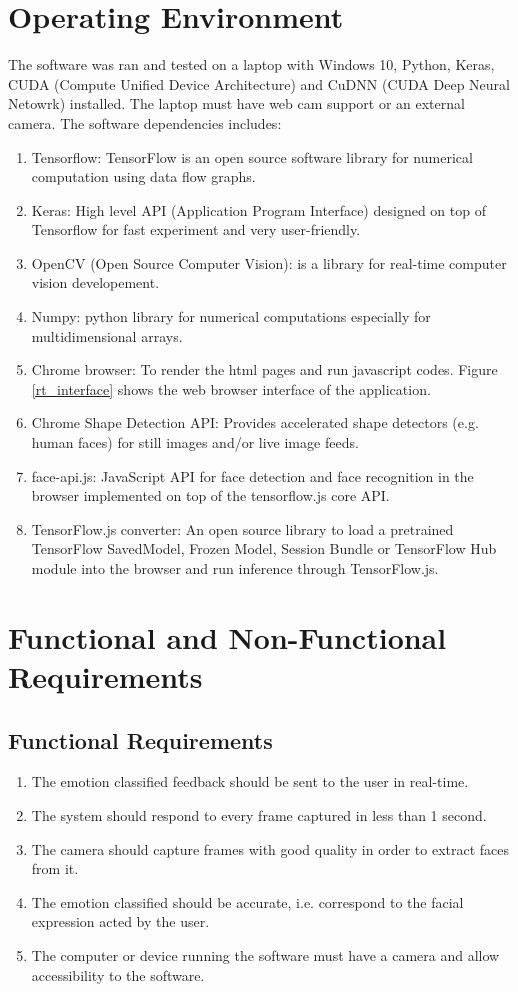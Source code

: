 \documentclass[master]{thesis-uestc}
\begin{document}
\section{Operating Environment}
The software was ran and tested on a laptop with Windows 10, Python, Keras, CUDA (Compute Unified Device Architecture) and CuDNN (CUDA Deep Neural Netowrk) installed. The laptop must have web cam support or an external camera. The software dependencies includes:
\begin{enumerate}
    \item Tensorflow: TensorFlow is an open source software library for numerical computation using data flow graphs.
    \item Keras: High level API (Application Program Interface) designed on top of Tensorflow for fast experiment and very user-friendly.
    \item OpenCV (Open Source Computer Vision): is a library for real-time computer vision developement.
    \item Numpy: python library for numerical computations especially for multidimensional arrays.
    \item Chrome browser: To render the html pages and run javascript codes. Figure \ref{rt_interface} shows the web browser interface of the application.
    \item Chrome Shape Detection API: Provides accelerated shape detectors (e.g. human faces) for still images and/or live image feeds.
    \item face-api.js: JavaScript API for face detection and face recognition in the browser implemented on top of the tensorflow.js core API.
    \item TensorFlow.js converter: An open source library to load a pretrained TensorFlow SavedModel, Frozen Model, Session Bundle or TensorFlow Hub module into the browser and run inference through TensorFlow.js.
\end{enumerate}

\section{Functional and Non-Functional Requirements}
\subsection{Functional Requirements}
\begin{enumerate}
    \item The emotion classified feedback should be sent to the user in real-time.
    \item The system should respond to every frame captured in less than 1 second.
    \item The camera should capture frames with good quality in order to extract faces from it.
    \item The emotion classified should be accurate, i.e. correspond to the facial expression acted by the user.
    \item The computer or device running the software must have a camera and allow accessibility to the software.
\end{enumerate}
\end{document}
